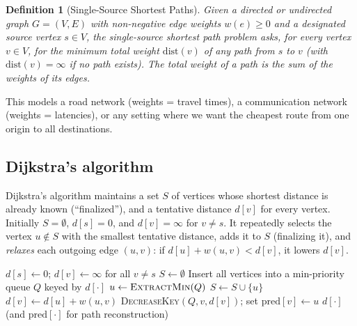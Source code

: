 \documentclass[11pt]{article}
\newtheorem{definition}[theorem]{Definition}
\begin{document}
\begin{definition}[Single-Source Shortest Paths]
Given a directed or undirected graph $G = (V,E)$ with non-negative edge weights
$w(e) \ge 0$ and a designated \emph{source} vertex $s \in V$, the
\emph{single-source shortest path problem} asks, for every vertex $v \in V$, for
the minimum total weight $\mathrm{dist}(v)$ of any path from $s$ to $v$ (with
$\mathrm{dist}(v) = \infty$ if no path exists). The total weight of a path is the
sum of the weights of its edges.
\end{definition}

This models a road network (weights = travel times), a communication network
(weights = latencies), or any setting where we want the cheapest route from one
origin to all destinations.

\subsection{Dijkstra's algorithm}

Dijkstra's algorithm maintains a set $S$ of vertices whose shortest distance is
already known (``finalized''), and a tentative distance $d[v]$ for every vertex.
Initially $S = \emptyset$, $d[s]=0$, and $d[v]=\infty$ for $v \ne s$. It
repeatedly selects the vertex $u \notin S$ with the smallest tentative distance,
adds it to $S$ (finalizing it), and \emph{relaxes} each outgoing edge $(u,v)$:
if $d[u] + w(u,v) < d[v]$, it lowers $d[v]$.

\begin{algorithm}[h]
\caption{Dijkstra's Single-Source Shortest Paths}
\begin{algorithmic}[1]
\State $d[s] \gets 0$; \quad $d[v] \gets \infty$ for all $v \ne s$
\State $S \gets \emptyset$
\State Insert all vertices into a min-priority queue $Q$ keyed by $d[\cdot]$
    \State $u \gets \textsc{ExtractMin}(Q)$ 
    \State $S \gets S \cup \{u\}$ 
            \State $d[v] \gets d[u] + w(u,v)$ 
            \State \textsc{DecreaseKey}$(Q, v, d[v])$; \quad set $\mathrm{pred}[v] \gets u$
        \EndIf
    \EndFor
\EndWhile
\State \Return $d[\cdot]$ (and $\mathrm{pred}[\cdot]$ for path reconstruction)
\end{algorithmic}
\end{algorithm}
\end{document}
